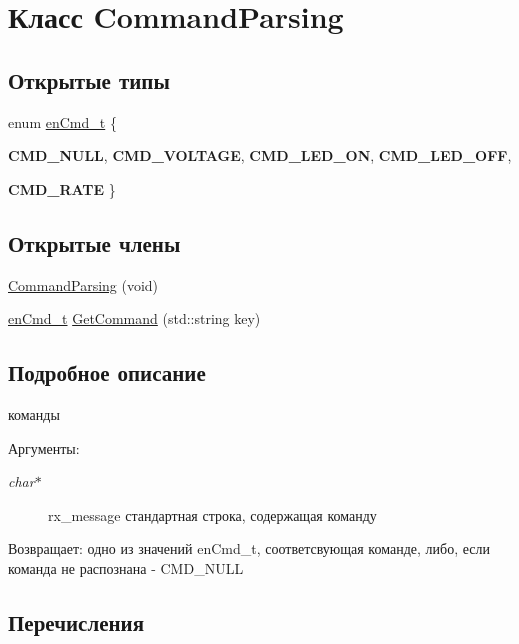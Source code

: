 \hypertarget{class_command_parsing}{
\section{Класс CommandParsing}
\label{class_command_parsing}
}
\subsection*{Открытые типы}
\begin{CompactItemize}
\item 
enum \hyperlink{class_command_parsing_614d78523d2c549667f60ebbb7c8cf0a}{enCmd\_\-t} \{ \par
\textbf{CMD\_\-NULL}, 
\textbf{CMD\_\-VOLTAGE}, 
\textbf{CMD\_\-LED\_\-ON}, 
\textbf{CMD\_\-LED\_\-OFF}, 
\par
\textbf{CMD\_\-RATE}
 \}
\subsection*{Открытые члены}
\begin{CompactItemize}
\item 
\hyperlink{class_command_parsing_4917d73a32e1c34993a701ada45cdeb1}{CommandParsing} (void)
\item 
\hyperlink{class_command_parsing_614d78523d2c549667f60ebbb7c8cf0a}{enCmd\_\-t} \hyperlink{class_command_parsing_2d2e902f2065cd35f683976575e8dddb}{GetCommand} (std::string key)
\end{CompactItemize}


\subsection{Подробное описание}
команды \begin{Desc}
\item[Аргументы:]
\begin{description}
\item[{\em char$\ast$}]rx\_\-message стандартная строка, содержащая команду \end{description}
\end{Desc}
\begin{Desc}
\item[Возвращает:]одно из значений enCmd\_\-t, соответсвующая команде, либо, если команда не распознана - CMD\_\-NULL \end{Desc}


\subsection{Перечисления}
\hypertarget{class_command_parsing_614d78523d2c549667f60ebbb7c8cf0a}{
}
\end{CompactItemize}
